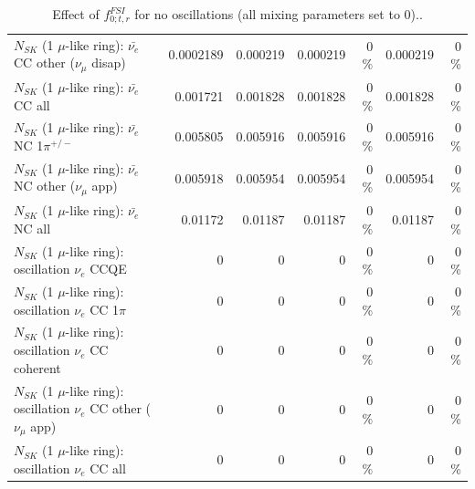 \begin{table}
\begin{tabular}{| l | r | r | r  r | r  r |}
          $N_{SK}$ (1 $\mu$-like ring): $\bar{\nu_e}$ CC other ($\nu_\mu$ disap) &       0.0002189 &        0.000219 &        0.000219 &        0 \%  &        0.000219 &        0 \%  \\ 
                            $N_{SK}$ (1 $\mu$-like ring): $\bar{\nu_{e}}$ CC all &        0.001721 &        0.001828 &        0.001828 &        0 \%  &        0.001828 &        0 \%  \\ 
\hline
                     $N_{SK}$ (1 $\mu$-like ring): $\bar{\nu_e}$ NC 1$\pi^{+/-}$ &        0.005805 &        0.005916 &        0.005916 &        0 \%  &        0.005916 &        0 \%  \\ 
            $N_{SK}$ (1 $\mu$-like ring): $\bar{\nu_e}$ NC other ($\nu_\mu$ app) &        0.005918 &        0.005954 &        0.005954 &        0 \%  &        0.005954 &        0 \%  \\ 
                            $N_{SK}$ (1 $\mu$-like ring): $\bar{\nu_{e}}$ NC all &         0.01172 &         0.01187 &         0.01187 &        0 \%  &         0.01187 &        0 \%  \\ 
\hline
\hline
\hline
                          $N_{SK}$ (1 $\mu$-like ring): oscillation $\nu_e$ CCQE &               0 &               0 &               0 &        0 \%  &               0 &        0 \%  \\ 
                     $N_{SK}$ (1 $\mu$-like ring): oscillation $\nu_e$ CC 1$\pi$ &               0 &               0 &               0 &        0 \%  &               0 &        0 \%  \\ 
                   $N_{SK}$ (1 $\mu$-like ring): oscillation $\nu_e$ CC coherent &               0 &               0 &               0 &        0 \%  &               0 &        0 \%  \\ 
      $N_{SK}$ (1 $\mu$-like ring): oscillation $\nu_e$ CC other ($\nu_\mu$ app) &               0 &               0 &               0 &        0 \%  &               0 &        0 \%  \\ 
                       $N_{SK}$ (1 $\mu$-like ring): oscillation $\nu_e$  CC all &               0 &               0 &               0 &        0 \%  &               0 &        0 \%  \\ 
\hline
\hline
\end{tabular}
\caption{ Effect of $f_{0; t, r}^{FSI}$ for no oscillations (all mixing parameters set to 0).. }
\label{tab:num_fsi_000_1RmuT_3f_osc_t13:0_spectralreco_spectraltrue}
\end{table}
\clearpage

